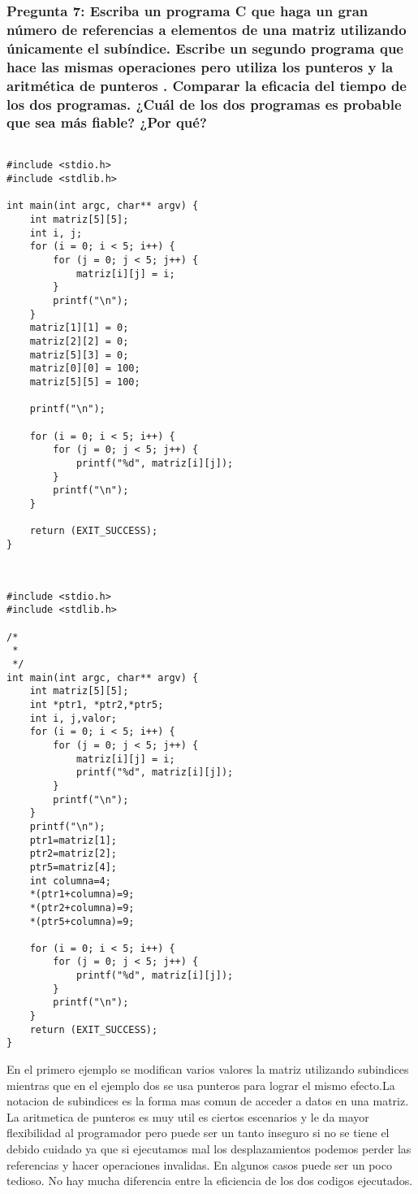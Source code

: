 \subsubsection{Pregunta 7: Escriba un programa C que haga un gran número de referencias a elementos de una matriz utilizando únicamente el subíndice. Escribe un segundo programa que hace las mismas operaciones pero utiliza los punteros y la aritmética de punteros . Comparar la eficacia del tiempo de los dos programas. ¿Cuál de los dos programas es probable que sea más fiable? ¿Por qué?}

\lstset{language = C} 
\begin{lstlisting}[frame = single] %Comienzo del Código

#include <stdio.h>
#include <stdlib.h>

int main(int argc, char** argv) {
    int matriz[5][5];
    int i, j;
    for (i = 0; i < 5; i++) {
        for (j = 0; j < 5; j++) {
            matriz[i][j] = i;
        }
        printf("\n");
    }
    matriz[1][1] = 0;
    matriz[2][2] = 0;
    matriz[5][3] = 0;
    matriz[0][0] = 100;
    matriz[5][5] = 100;
    
    printf("\n");
    
    for (i = 0; i < 5; i++) {
        for (j = 0; j < 5; j++) {
            printf("%d", matriz[i][j]);
        }
        printf("\n");
    }

    return (EXIT_SUCCESS);
}


\end{lstlisting}


\lstset{language = C} 
\begin{lstlisting}[frame = single] %Comienzo del Código

#include <stdio.h>
#include <stdlib.h>

/*
 * 
 */
int main(int argc, char** argv) {
    int matriz[5][5];
    int *ptr1, *ptr2,*ptr5;
    int i, j,valor;
    for (i = 0; i < 5; i++) {
        for (j = 0; j < 5; j++) {
            matriz[i][j] = i;
            printf("%d", matriz[i][j]);
        }
        printf("\n");
    }
    printf("\n");
    ptr1=matriz[1];
    ptr2=matriz[2];
    ptr5=matriz[4];
    int columna=4;
    *(ptr1+columna)=9;
    *(ptr2+columna)=9;
    *(ptr5+columna)=9;
    
    for (i = 0; i < 5; i++) {
        for (j = 0; j < 5; j++) {
            printf("%d", matriz[i][j]);
        }
        printf("\n");
    }
    return (EXIT_SUCCESS);
}

\end{lstlisting}

En el primero ejemplo se modifican varios valores la matriz utilizando subindices mientras que en el ejemplo dos se usa punteros para lograr el mismo efecto.La notacion de subindices es la forma mas comun de acceder a datos en una matriz. La aritmetica de punteros es muy util es ciertos escenarios y le da mayor flexibilidad al programador pero puede ser un tanto inseguro si no se tiene el debido cuidado ya que si ejecutamos mal los desplazamientos podemos perder las referencias y hacer operaciones invalidas. En algunos casos puede ser un poco tedioso.
No hay mucha diferencia entre la eficiencia de los dos codigos ejecutados.


